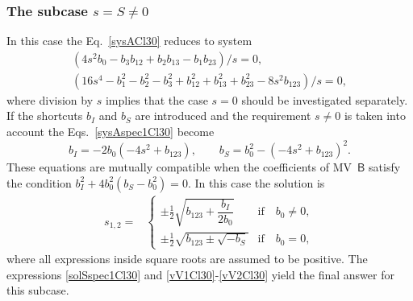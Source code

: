 \documentclass{birkjour}
\def\B{\mathsf{B}}
\begin{document}
\subsubsection{The subcase $s=S\neq 0$}
  In this case the Eq.~\eqref{sysACl30} reduces to system
\begin{equation}\begin{split}\label{sysAspec1Cl30}
  (4 s^2 b_0-b_3 b_{12}+b_2 b_{13}-b_1 b_{23})/s=0,\\
  (16 s^4-b_1^2-b_2^2-b_3^2+b_{12}^2+b_{13}^2+b_{23}^2-8 s^2 b_{123})/s=0,
 \end{split}\end{equation}
where division by $s$ implies that the case $s=0$ should be
investigated separately. If the shortcuts $b_I$ and $b_S$ are
introduced and the requirement $s\neq 0$  is taken into account
the Eqs.~\eqref{sysAspec1Cl30} become
\begin{equation}\label{sysAspec30}
  b_I=-2b_0 (-4 s^2+ b_{123}),\qquad
  b_S=b_0^2-(-4 s^2+b_{123})^2.
\end{equation}
These equations are mutually compatible when the coefficients of
MV~$\B$ satisfy the condition $b_{I}^2+4 b_0^2(b_S- b_0^2)=0$. In
this case the solution is
\begin{equation}\begin{split}\label{solSspec1Cl30}
s_{1,2} =&\begin{cases}
\pm\tfrac12\sqrt{b_{123}+\dfrac{b_I}{2 b_0}} & \textrm{if}\quad b_0\neq  0,\\
\pm\tfrac12\sqrt{b_{123}\pm\sqrt{-b_S}} & \textrm{if}\quad b_0 =  0,
  \end{cases}
\end{split}\end{equation}
where all expressions inside square roots are assumed to be
positive. The expressions  \eqref{solSspec1Cl30} and
\eqref{vV1Cl30}-\eqref{vV2Cl30} yield the final answer for this
subcase.
\end{document}
